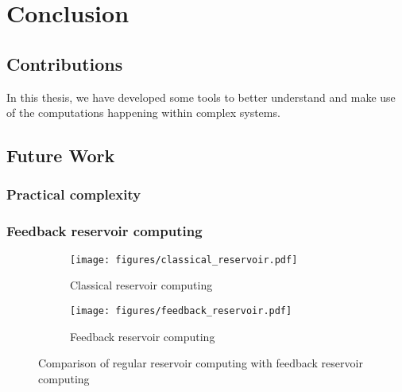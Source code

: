 \chapter{Conclusion}

%
\section{Contributions}

In this thesis, we have developed some tools to better understand and make use
of the computations happening within complex systems.

\section{Future Work}

\subsection{Practical complexity}

\subsection{Feedback reservoir computing}

\begin{figure}[htbp]
  \centering
  \begin{subfigure}[t]{.5\linewidth}
    \centering
    \texttt{[image: figures/classical\_reservoir.pdf]}
    \caption{Classical reservoir computing}
    \label{fig:classical_reservoir}
  \end{subfigure}
  \begin{subfigure}[t]{.45\linewidth}
    \centering
    \texttt{[image: figures/feedback\_reservoir.pdf]}
    \caption{Feedback reservoir computing}
    \label{fig:feedback_reservoir}
  \end{subfigure}
  \caption{Comparison of regular reservoir computing with feedback reservoir computing}
  \label{"waiting for reftex-label call..."}
\end{figure}
